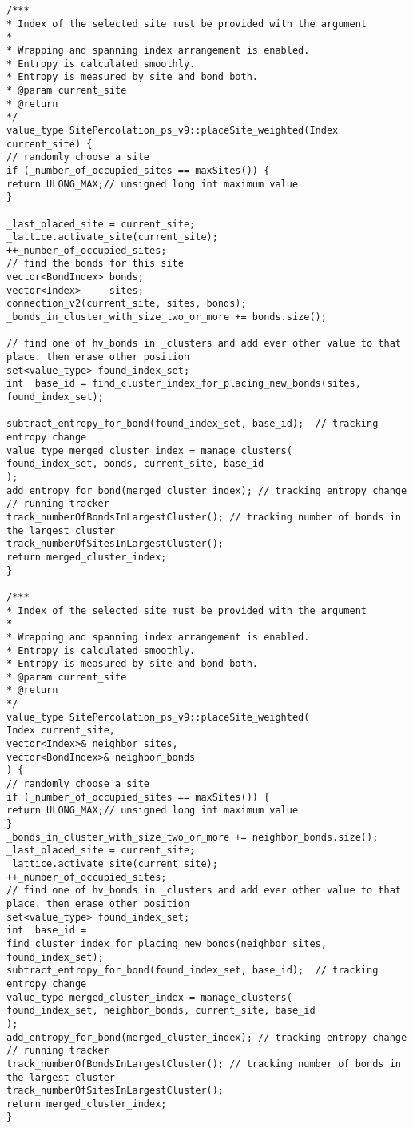 \begin{lstlisting}[style=CStyle]
/***
* Index of the selected site must be provided with the argument
*
* Wrapping and spanning index arrangement is enabled.
* Entropy is calculated smoothly.
* Entropy is measured by site and bond both.
* @param current_site
* @return
*/
value_type SitePercolation_ps_v9::placeSite_weighted(Index current_site) {
// randomly choose a site
if (_number_of_occupied_sites == maxSites()) {
return ULONG_MAX;// unsigned long int maximum value
}

_last_placed_site = current_site;
_lattice.activate_site(current_site);
++_number_of_occupied_sites;
// find the bonds for this site
vector<BondIndex> bonds;
vector<Index>     sites;
connection_v2(current_site, sites, bonds);
_bonds_in_cluster_with_size_two_or_more += bonds.size();

// find one of hv_bonds in _clusters and add ever other value to that place. then erase other position
set<value_type> found_index_set;
int  base_id = find_cluster_index_for_placing_new_bonds(sites, found_index_set);

subtract_entropy_for_bond(found_index_set, base_id);  // tracking entropy change
value_type merged_cluster_index = manage_clusters(
found_index_set, bonds, current_site, base_id
);
add_entropy_for_bond(merged_cluster_index); // tracking entropy change
// running tracker
track_numberOfBondsInLargestCluster(); // tracking number of bonds in the largest cluster
track_numberOfSitesInLargestCluster();
return merged_cluster_index;
}

/***
* Index of the selected site must be provided with the argument
*
* Wrapping and spanning index arrangement is enabled.
* Entropy is calculated smoothly.
* Entropy is measured by site and bond both.
* @param current_site
* @return
*/
value_type SitePercolation_ps_v9::placeSite_weighted(
Index current_site,
vector<Index>& neighbor_sites,
vector<BondIndex>& neighbor_bonds
) {
// randomly choose a site
if (_number_of_occupied_sites == maxSites()) {
return ULONG_MAX;// unsigned long int maximum value
}
_bonds_in_cluster_with_size_two_or_more += neighbor_bonds.size();
_last_placed_site = current_site;
_lattice.activate_site(current_site);
++_number_of_occupied_sites;
// find one of hv_bonds in _clusters and add ever other value to that place. then erase other position
set<value_type> found_index_set;
int  base_id = find_cluster_index_for_placing_new_bonds(neighbor_sites, found_index_set);
subtract_entropy_for_bond(found_index_set, base_id);  // tracking entropy change
value_type merged_cluster_index = manage_clusters(
found_index_set, neighbor_bonds, current_site, base_id
);
add_entropy_for_bond(merged_cluster_index); // tracking entropy change
// running tracker
track_numberOfBondsInLargestCluster(); // tracking number of bonds in the largest cluster
track_numberOfSitesInLargestCluster();
return merged_cluster_index;
}




\end{lstlisting}
